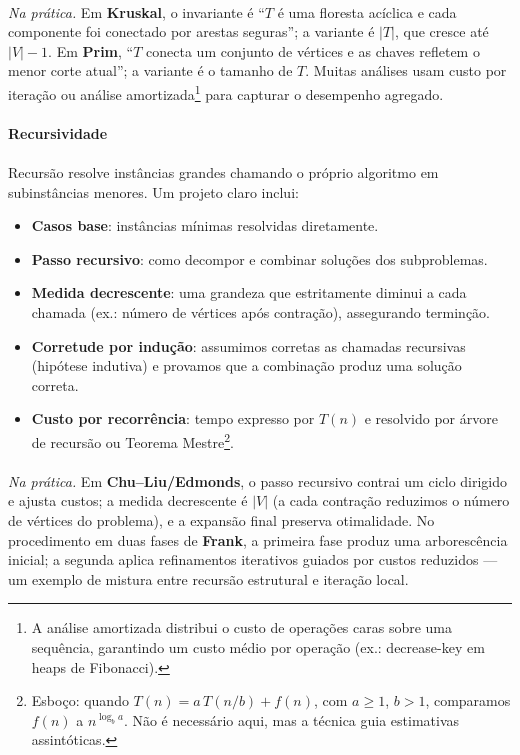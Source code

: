 \documentclass[12pt,a4paper]{article}
\def\texttt#1{#1}%
\def\emph#1{#1}%
\begin{document}
\paragraph{}
\textit{Na prática.} Em \textbf{Kruskal}, o invariante é “$T$ é uma floresta acíclica e cada componente foi conectado por arestas seguras”; a variante é $|T|$, que cresce até $|V|-1$. Em \textbf{Prim}, “$T$ conecta um conjunto de vértices e as chaves refletem o menor corte atual”; a variante é o tamanho de $T$. Muitas análises usam \emph{custo por iteração} ou \emph{análise amortizada}\footnote{A análise amortizada distribui o custo de operações caras sobre uma sequência, garantindo um custo médio por operação (ex.: \texttt{decrease-key} em heaps de Fibonacci).} para capturar o desempenho agregado.

\paragraph{Recursividade}
\paragraph{}
Recursão resolve instâncias grandes chamando o próprio algoritmo em subinstâncias menores. Um projeto claro inclui:

\begin{itemize}\setlength{\itemsep}{2pt}
    \item \textbf{Casos base}: instâncias mínimas resolvidas diretamente.
    \item \textbf{Passo recursivo}: como decompor e combinar soluções dos subproblemas.
    \item \textbf{Medida decrescente}: uma grandeza que estritamente diminui a cada chamada (ex.: número de vértices após contração), assegurando terminção.
    \item \textbf{Corretude por indução}: assumimos corretas as chamadas recursivas (hipótese indutiva) e provamos que a combinação produz uma solução correta.
    \item \textbf{Custo por recorrência}: tempo expresso por $T(n)$ e resolvido por \emph{árvore de recursão} ou Teorema Mestre\footnote{Esboço: quando $T(n)=a\,T(n/b)+f(n)$, com $a\ge 1$, $b>1$, comparamos $f(n)$ a $n^{\log_b a}$. Não é necessário aqui, mas a técnica guia estimativas assintóticas.}.
\end{itemize}

\paragraph{}
\textit{Na prática.} Em \textbf{Chu–Liu/Edmonds}, o passo recursivo contrai um ciclo dirigido e ajusta custos; a medida decrescente é $|V|$ (a cada contração reduzimos o número de vértices do problema), e a expansão final preserva otimalidade. No procedimento em duas fases de \textbf{Frank}, a primeira fase produz uma arborescência inicial; a segunda aplica \emph{refinamentos iterativos} guiados por custos reduzidos — um exemplo de mistura entre recursão estrutural e iteração local.
\end{document}
